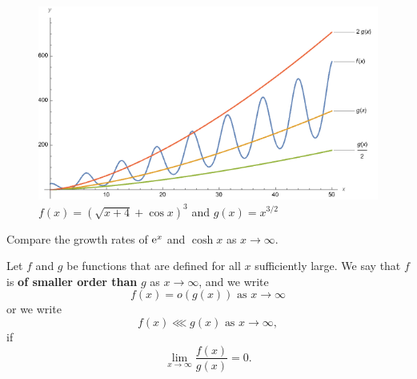 \begin{figure}[H]
\includegraphics[width=6.5in]{img/example2}\caption{$f(x) = (\sqrt{x+4}+\cos x)^3$ and $g(x) = x^{3/2}$}
\end{figure}

\newpage

\begin{example}
Compare the growth rates of $\mathrm{e}^x$ and $\cosh x$ as $x\to\infty$.
\end{example}

\newpage

\begin{definition}
Let $f$ and $g$ be functions that are defined for all $x$ sufficiently large.
We say that $f$ is \textbf{of smaller order than} $g$ as $x\to \infty$, and we write
\begin{equation*}
f(x) = o(g(x)) \text{ as } x\to \infty
\end{equation*}
or we write
\begin{equation*}
f(x) \lll g(x) \text{ as } x\to\infty,
\end{equation*}
if
\begin{equation*}
\lim_{x\to\infty}\frac{f(x)}{g(x)} = 0.
\end{equation*}
\end{definition}

